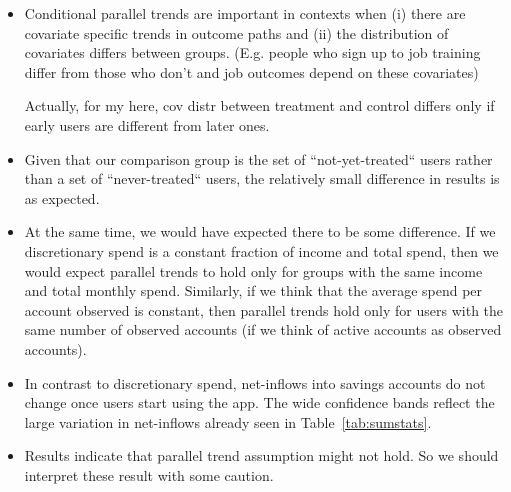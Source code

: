 \begin{itemize}
    \item Conditional parallel trends are important in contexts when (i) there
        are covariate specific trends in outcome paths and (ii) the
        distribution of covariates differs between groups. (E.g. people who
        sign up to job training differ from those who don't and job outcomes
        depend on these covariates)

        Actually, for my here, cov distr between treatment and control differs
        only if early users are different from later ones.

    \item  Given that our comparison group is the set of
        ``not-yet-treated`` users rather than a set of ``never-treated`` users,
        the relatively small difference in results is as expected.

    \item At the same time, we would have expected there to be some difference.
        If we discretionary spend is a constant fraction of income and total
        spend, then we would expect parallel trends to hold only for groups
        with the same income and total monthly spend. Similarly, if we think
        that the average spend per account observed is constant, then parallel
        trends hold only for users with the same number of observed accounts
        (if we think of active accounts as observed accounts).

    \item In contrast to discretionary spend, net-inflows into savings accounts
        do not change once users start using the app. The wide confidence
        bands reflect the large variation in net-inflows already seen in
        Table~\ref{tab:sumstats}.

    \item Results indicate that parallel trend assumption might not hold. So we
        should interpret these result with some caution.


\end{itemize}


